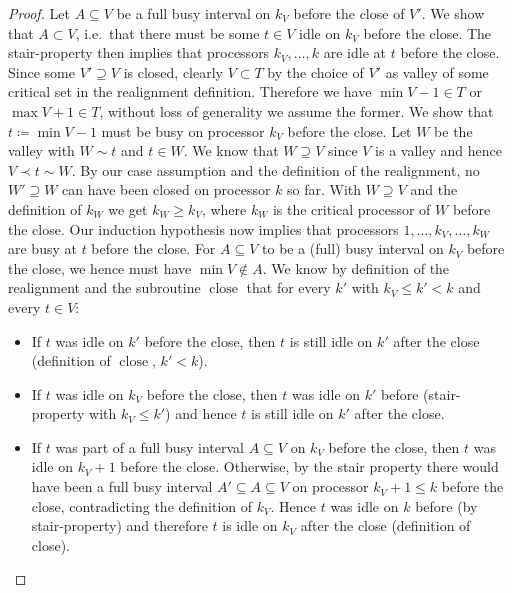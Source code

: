 \documentclass[a4paper]{article}
\DeclareMathOperator{\close}{close}
\begin{document}
\begin{proof}
      Let $A \subseteq V$ be a full busy interval on $k_V$ before the close of $V'$.
      We show that $A \subset V$, i.e.\ that there must be some $t \in V$ idle on $k_V$ before the close.
      The stair-property then implies that processors $k_V, \ldots, k$ are idle at $t$ before the close.
      Since some $V' \supseteq V$ is closed, clearly $V \subset T$ by the choice of $V'$ as valley of some critical set in the realignment definition.
      Therefore we have $\min V - 1 \in T$ or $\max V + 1 \in T$, without loss of generality we assume the former.
      We show that $t \coloneqq \min V - 1$ must be busy on processor $k_V$ before the close.
      Let $W$ be the valley with $W \sim t$ and $t \in W$.
      We know that $W \supseteq V$ since $V$ is a valley and hence $V \prec t \sim W$.
      By our case assumption and the definition of the realignment, no $W' \supseteq W$ can have been closed on processor $k$ so far.
      With $W \supseteq V$ and the definition of $k_W$ we get $k_W \geq k_V$, where $k_W$ is the critical processor of $W$ before the close.
      Our induction hypothesis now implies that processors $1, \ldots, k_V, \ldots, k_W$ are busy at $t$ before the close.
      For $A \subseteq V$ to be a (full) busy interval on $k_V$ before the close, we hence must have $\min V \notin A$.
      We know by definition of the realignment and the subroutine $\close$ that for every $k'$ with $k_V \leq k' < k$ and every $t \in V$:
      \begin{itemize}
        \item
          If $t$ was idle on $k'$ before the close, then $t$ is still idle on $k'$ after the close (definition of $\close$, $k' < k$).
        \item
          If $t$ was idle on $k_V$ before the close, then $t$ was idle on $k'$ before (stair-property with $k_V \leq k'$) and hence $t$ is still idle on $k'$ after the close.
        \item
          If $t$ was part of a full busy interval $A \subseteq V$ on $k_V$ before the close, then $t$ was idle on $k_V + 1$ before the close.
          Otherwise, by the stair property there would have been a full busy interval $A' \subseteq A \subseteq V$ on processor $k_V + 1 \leq k$ before the close, contradicting the definition of $k_V$.
          Hence $t$ was idle on $k$ before (by stair-property) and therefore $t$ is idle on $k_V$ after the close (definition of close).
      \end{itemize}

\end{proof}
\end{document}
